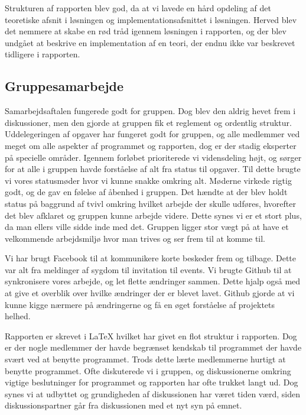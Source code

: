 \documentclass[a4paper,12pt,oneside]{article}
\begin{document}
Strukturen af rapporten blev god, da at vi lavede en hård opdeling af det teoretiske afsnit i løsningen og implementationsafsnittet i løsningen. Herved blev det nemmere at skabe en rød tråd igennem løsningen i rapporten, og der blev undgået at beskrive en implementation af en teori, der endnu ikke var beskrevet tidligere i rapporten.

\subsection{Gruppesamarbejde}

Samarbejdsaftalen fungerede godt for gruppen. Dog blev den aldrig hevet frem i diskussioner, men den gjorde at gruppen fik et reglement og ordentlig struktur. Uddelegeringen af opgaver har fungeret godt for gruppen, og alle medlemmer ved meget om alle aspekter af programmet og rapporten, dog er der stadig eksperter på specielle områder. Igennem forløbet prioriterede vi vidensdeling højt, og sørger for at alle i gruppen havde forståelse af alt fra status til opgaver. Til dette brugte vi vores statusmøder hvor vi kunne snakke omkring alt. Møderne virkede rigtig godt, og de gav en følelse af åbenhed i gruppen. Det hændte at der blev holdt status på baggrund af tvivl omkring hvilket arbejde der skulle udføres, hvorefter det blev afklaret og gruppen kunne arbejde videre. Dette synes vi er et stort plus, da man ellers ville sidde inde med det. Gruppen ligger stor vægt på at have et velkommende arbejdsmiljø hvor man trives og ser frem til at komme til.

Vi har brugt Facebook til at kommunikere korte beskeder frem og tilbage. Dette var alt fra meldinger af sygdom til invitation til events. Vi brugte Github til at synkronisere vores arbejde, og let flette ændringer sammen. Dette hjalp også med at give et overblik over hvilke ændringer der er blevet lavet. Github gjorde at vi kunne kigge nærmere på ændringerne og få en øget forståelse af projektets helhed. 

Rapporten er skrevet i LaTeX hvilket har givet en flot struktur i rapporten. Dog er der nogle medlemmer der havde begrænset kendskab til programmet der havde svært ved at benytte programmet. Trods dette lærte medlemmerne hurtigt at benytte programmet. Ofte diskuterede vi i gruppen, og diskussionerne omkring vigtige beslutninger for programmet og rapporten har ofte trukket langt ud. Dog synes vi at udbyttet og grundigheden af diskussionen har været tiden værd, siden diskussionspartner går fra diskussionen med et nyt syn på emnet.
\end{document}
